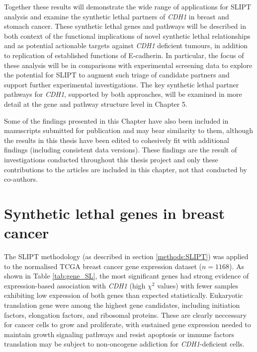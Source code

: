 Together these results will demonstrate the wide range of applications for SLIPT analysis and examine the synthetic lethal partners of \textit{CDH1} in breast and stomach cancer. These synthetic lethal genes and pathways will be described in both context of the functional implications of novel synthetic lethal relationships and as potential actionable targets against \textit{CDH1} deficient tumours, in addition to replication of established functions of E-cadherin. In particular, the focus of these analysis will be in comparisons with experimental screening data to explore the potential for SLIPT to augment such triage of candidate partners and support further experimental investigations. The key synthetic lethal partner pathways for \textit{CDH1}, supported by both approaches, will be examined in more detail at the gene and pathway structure level in Chapter 5.

Some of the findings presented in this Chapter have also been included in manuscripts submitted for publication \citep{KellyHDGC, KellyBMC} and may bear similarity to them, although the results in this thesis have been edited to cohesively fit with additional findings (including consistent data versions). These findings are the result of investigations conducted throughout this thesis project and only these contributions to the articles are included in this chapter, not that conducted by co-authors.

\section{Synthetic lethal genes in breast cancer} \label{chapt3:exprSL_genes}

The SLIPT methodology (as described in section \ref{methods:SLIPT}) was applied to the normalised TCGA breast cancer gene expression dataset ($n = 1168$). As shown in Table \ref{tab:gene_SL}, the most significant genes had strong evidence of expression-based association with \textit{CDH1} (high $\chi^2$ values) with fewer samples exhibiting low expression of both genes than expected statistically. Eukaryotic translation gene were among the highest gene candidates, including initiation factors, elongation factors, and ribosomal proteins. These are clearly neccessary for cancer cells to grow and proliferate, with sustained gene expression needed to maintain growth signaling pathways and resist apoptosis or immune factors translation may be subject to non-oncogene addiction for \textit{CDH1}-deficient cells.

